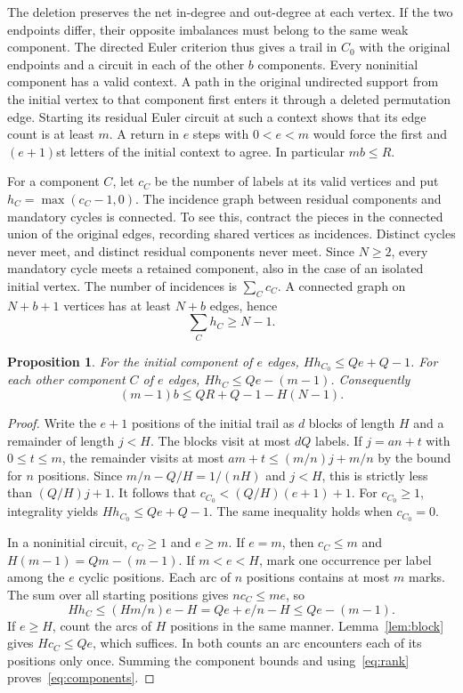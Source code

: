 \documentclass[11pt]{article}
\newtheorem{proposition}[theorem]{Proposition}
\begin{document}
The deletion preserves the net in-degree and out-degree at each vertex. If the two endpoints differ, their opposite imbalances must belong to the same weak component. The directed Euler criterion thus gives a trail in $C_0$ with the original endpoints and a circuit in each of the other $b$ components. Every noninitial component has a valid context. A path in the original undirected support from the initial vertex to that component first enters it through a deleted permutation edge. Starting its residual Euler circuit at such a context shows that its edge count is at least $m$. A return in $e$ steps with $0<e<m$ would force the first and $(e+1)$st letters of the initial context to agree. In particular $mb\le R$.

For a component $C$, let $c_C$ be the number of labels at its valid vertices and put $h_C=\max(c_C-1,0)$. The incidence graph between residual components and mandatory cycles is connected. To see this, contract the pieces in the connected union of the original edges, recording shared vertices as incidences. Distinct cycles never meet, and distinct residual components never meet. Since $N\ge2$, every mandatory cycle meets a retained component, also in the case of an isolated initial vertex. The number of incidences is $\sum_C c_C$. A connected graph on $N+b+1$ vertices has at least $N+b$ edges, hence
\begin{equation}
 \sum_C h_C\ge N-1.\label{eq:rank}
\end{equation}

\begin{proposition}\label{prop:price}
For the initial component of $e$ edges, $Hh_{C_0}\le Qe+Q-1$. For each other component $C$ of $e$ edges, $Hh_C\le Qe-(m-1)$. Consequently
\begin{equation}
 (m-1)b\le QR+Q-1-H(N-1).\label{eq:components}
\end{equation}
\end{proposition}
\begin{proof}
Write the $e+1$ positions of the initial trail as $d$ blocks of length $H$ and a remainder of length $j<H$. The blocks visit at most $dQ$ labels. If $j=an+t$ with $0\le t\le m$, the remainder visits at most $am+t\le (m/n)j+m/n$ by the bound for $n$ positions. Since $m/n-Q/H=1/(nH)$ and $j<H$, this is strictly less than $(Q/H)j+1$. It follows that $c_{C_0}< (Q/H)(e+1)+1$. For $c_{C_0}\ge1$, integrality yields $Hh_{C_0}\le Qe+Q-1$. The same inequality holds when $c_{C_0}=0$.

In a noninitial circuit, $c_C\ge1$ and $e\ge m$. If $e=m$, then $c_C\le m$ and $H(m-1)=Qm-(m-1)$. If $m<e<H$, mark one occurrence per label among the $e$ cyclic positions. Each arc of $n$ positions contains at most $m$ marks. The sum over all starting positions gives $n c_C\le me$, so
\[
 Hh_C\le (Hm/n)e-H=Qe+e/n-H\le Qe-(m-1).
\]
If $e\ge H$, count the arcs of $H$ positions in the same manner. Lemma~\ref{lem:block} gives $Hc_C\le Qe$, which suffices. In both counts an arc encounters each of its positions only once. Summing the component bounds and using~\eqref{eq:rank} proves~\eqref{eq:components}.
\end{proof}
\end{document}
